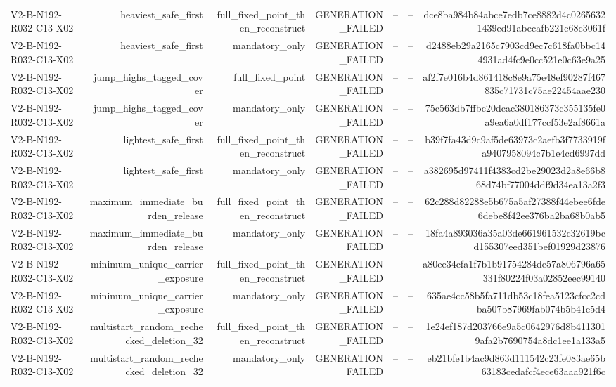 {\begin{longtable}{lrrrrrr}
V2-B-N192-R032-C13-X02 & heaviest\_safe\_first & full\_fixed\_point\_then\_reconstruct & GENERATION\_FAILED & -- & -- & dce8ba984b84abce7edb7ce8882d4c02656321439ed91abecafb221e68c3061f \\
V2-B-N192-R032-C13-X02 & heaviest\_safe\_first & mandatory\_only & GENERATION\_FAILED & -- & -- & d2488eb29a2165c7903cd9ec7c618fa0bbc144931ad4fc9e0cc521e0c63e9a25 \\
V2-B-N192-R032-C13-X02 & jump\_highs\_tagged\_cover & full\_fixed\_point & GENERATION\_FAILED & -- & -- & af2f7e016b4d861418c8e9a75e48ef90287f467835c71731c75ae22454aae230 \\
V2-B-N192-R032-C13-X02 & jump\_highs\_tagged\_cover & mandatory\_only & GENERATION\_FAILED & -- & -- & 75c563db7ffbc20dcac380186373c355135fe0a9ea6a0df177ccf53e2af8661a \\
V2-B-N192-R032-C13-X02 & lightest\_safe\_first & full\_fixed\_point\_then\_reconstruct & GENERATION\_FAILED & -- & -- & b39f7fa43d9c9af5de63973c2aefb3f7733919fa9407958094c7b1e4cd6997dd \\
V2-B-N192-R032-C13-X02 & lightest\_safe\_first & mandatory\_only & GENERATION\_FAILED & -- & -- & a382695d97411f4383cd2be29023d2a8e66b868d74bf77004ddf9d34ea13a2f3 \\
V2-B-N192-R032-C13-X02 & maximum\_immediate\_burden\_release & full\_fixed\_point\_then\_reconstruct & GENERATION\_FAILED & -- & -- & 62c288d82288e5b675a5af27388f44ebee6fde6debe8f42ee376ba2ba68b0ab5 \\
V2-B-N192-R032-C13-X02 & maximum\_immediate\_burden\_release & mandatory\_only & GENERATION\_FAILED & -- & -- & 18fa4a893036a35a03de661961532c32619bcd155307eed351bef01929d23876 \\
V2-B-N192-R032-C13-X02 & minimum\_unique\_carrier\_exposure & full\_fixed\_point\_then\_reconstruct & GENERATION\_FAILED & -- & -- & a80ee34cfa1f7b1b91754284de57a806796a65331f80224f03a02852eec99140 \\
V2-B-N192-R032-C13-X02 & minimum\_unique\_carrier\_exposure & mandatory\_only & GENERATION\_FAILED & -- & -- & 635ae4cc58b5fa711db53c18fea5123cfcc2cdba507b87969fab074b5b41e5d4 \\
V2-B-N192-R032-C13-X02 & multistart\_random\_rechecked\_deletion\_32 & full\_fixed\_point\_then\_reconstruct & GENERATION\_FAILED & -- & -- & 1e24ef187d203766e9a5c0642976d8b4113019afa2b7690754a8dc1ee1a133a5 \\
V2-B-N192-R032-C13-X02 & multistart\_random\_rechecked\_deletion\_32 & mandatory\_only & GENERATION\_FAILED & -- & -- & eb21bfe1b4ac9d863d111542c23fe083ae65b63183cedafcf4ece63aaa921f6c \\

\end{longtable}}
